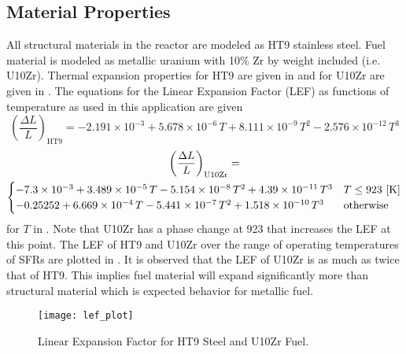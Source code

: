   \subsection{Material Properties}
    \label{sec:model_details__material_properties}
    All structural materials in the reactor are modeled as HT9 stainless steel.
    Fuel material is modeled as metallic uranium with 10\% Zr by weight included
    (i.e. U10Zr). Thermal expansion properties for HT9 are given in 
    \cite{ht9Prop} and for U10Zr are given in \cite{thexpU10Zr}. The equations 
    for the Linear Expansion Factor (LEF) as functions of temperature as used in
    this application are given
    \begin{equation}
      \label{eq:lef_ht9}
      \left( \frac{\Delta L}{L} \right)_{\text{HT9}} = 
        -2.191 \times 10^{-3} + 5.678 \times 10^{-6} \, T + 
        8.111 \times 10^{-9} \, T^2 - 2.576 \times 10^{-12} \, T^3 
    \end{equation}
    \begin{multline}
      \label{eq:lef_u10zr}
      \left( \frac{\Delta L}{L} \right)_{\text{U10Zr}} = \\
        \begin{cases}
          -7.3 \times 10^{-3} + 3.489 \times 10^{-5} \, T 
            - 5.154 \times 10^{-8} \, T^2 + 4.39 \times 10^{-11} \, T^3 & 
            T \le 923 \,\left[\text{{K}}\right] \\
          -0.25252 + 6.669 \times 10^{-4} \, T - 5.441 \times 10^{-7} \, T^2 
            + 1.518 \times 10^{-10} \, T^3 & \text{otherwise}
        \end{cases}
    \end{multline}
    for $T$ in . Note that U10Zr has a phase change at 923  
    that increases the LEF at this point. The LEF of HT9 and U10Zr over the 
    range of operating temperatures of SFRs are plotted in . 
    It is observed that the LEF of U10Zr is as much as twice that of HT9. This 
    implies fuel material will expand significantly more than structural 
    material which is expected behavior for metallic fuel.

    \begin{figure}
      \centering
      \texttt{[image: lef\_plot]}
      \caption{Linear Expansion Factor for HT9 Steel and U10Zr Fuel.}
      \label{fig:lef_plot}
    \end{figure}
    
